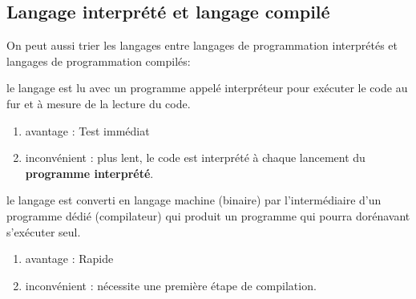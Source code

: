 \documentclass[11pt, a4paper]{book}
\begin{document}
\subsection{Langage interprété et langage compilé}		
On peut aussi trier les langages entre langages de programmation interprétés  et langages de programmation compilés:
\begin{enumerate}
	 le langage est lu avec un programme appelé interpréteur pour exécuter le code au fur et à mesure de la lecture du code.  \\
	\begin{enumerate}
		\item{avantage :} Test immédiat 
		\item{inconvénient :} plus lent, le code est interprété à chaque lancement du \textbf{programme interprété}.
	\end{enumerate}
	 le langage est converti en langage machine (binaire) par l'intermédiaire d'un programme dédié (compilateur) qui produit un programme qui pourra dorénavant s'exécuter seul.\\
	\begin{enumerate}
		\item{avantage :} Rapide
		\item{inconvénient :} nécessite une première étape de compilation.
	\end{enumerate}
\end{enumerate}
\end{document}
